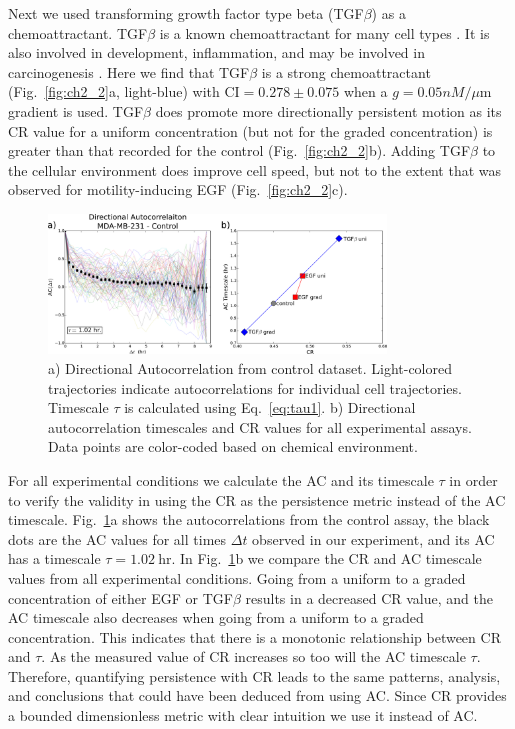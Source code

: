 Next we used transforming growth factor type beta (TGF$\beta$) as a chemoattractant. TGF$\beta$ is a known chemoattractant for many cell types \cite{wahl1987transforming,bischoff1997chemotaxis}.
It is also involved in development, inflammation, and may be involved in carcinogenesis \cite{clark1998molecules,javelaud2004mammalian,pang2016tgf}.
Here we find that TGF$\beta$ is a strong chemoattractant (Fig.\ \ref{fig:ch2_2}a, light-blue) with $\text{CI} = 0.278 \pm 0.075$ when a
$g = 0.05 nM / \mu\text{m}$ gradient is used.
TGF$\beta$ does promote more directionally persistent motion as its CR value for a uniform concentration (but not for the graded concentration) is greater than that recorded for the control (Fig.\ \ref{fig:ch2_2}b). Adding TGF$\beta$ to the cellular environment does improve cell speed, but not to the extent that was observed for motility-inducing EGF (Fig.\ \ref{fig:ch2_2}c).

\begin{figure}[ht]
    \centering
    \includegraphics[width=0.80\textwidth]{../fig/ch2_fig5.png}
    \caption{a) Directional Autocorrelation from control dataset. Light-colored trajectories indicate autocorrelations for individual cell trajectories. Timescale $\tau$ is calculated using Eq.\ \ref{eq:tau1}. b) Directional autocorrelation timescales and CR values for all experimental assays. Data points are color-coded based on chemical environment.} \label{fig:ch2_5}
\end{figure}

For all experimental conditions we calculate the AC and its timescale $\tau$ in order to verify the validity in using the CR as the persistence metric instead of the AC timescale. Fig.\ \ref{fig:ch2_5}a shows the autocorrelations from the control assay, the black dots are the AC values for all times $\Delta t$ observed in our experiment, and its AC has a timescale
$\tau = 1.02 \ \text{hr}$.
In Fig.\ \ref{fig:ch2_5}b we compare the CR and AC timescale values from all experimental conditions. Going from a uniform to a graded concentration of either EGF or TGF$\beta$ results in a decreased CR value, and the AC timescale also decreases when going from a uniform to a graded concentration. This indicates that there is a monotonic relationship between CR and $\tau$. As the measured value of CR increases so too will the AC timescale $\tau$.
Therefore, quantifying persistence with CR leads to the same patterns, analysis, and conclusions that could have been deduced from using AC. Since CR provides a bounded dimensionless metric with clear intuition we use it instead of AC.

